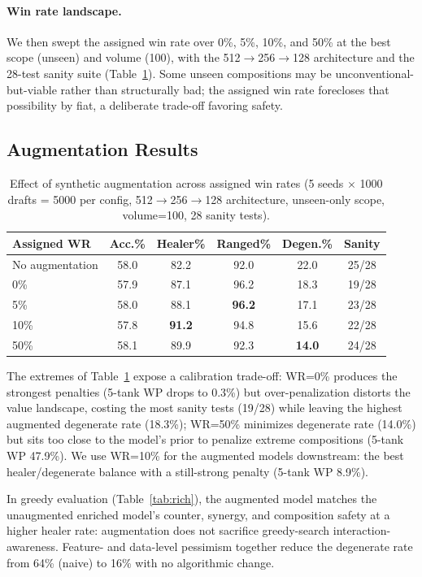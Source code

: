 \documentclass[journal]{IEEEtran}
\begin{document}
\paragraph{Win rate landscape.} We then swept the assigned win rate over 0\%, 5\%, 10\%, and 50\% at the best scope (unseen) and volume (100), with the 512$\to$256$\to$128 architecture and the 28-test sanity suite (Table~\ref{tab:synth}). Some unseen compositions may be unconventional-but-viable rather than structurally bad; the assigned win rate forecloses that possibility by fiat, a deliberate trade-off favoring safety.

\subsection{Augmentation Results}

\begin{table}[t]
\centering
\caption{Effect of synthetic augmentation across assigned win rates (5 seeds $\times$ 1000 drafts = 5000 per config, 512$\to$256$\to$128 architecture, unseen-only scope, volume=100, 28 sanity tests).}
\label{tab:synth}
\setlength{\tabcolsep}{4.5pt}
\begin{tabular}{lccccc}
\toprule
Assigned WR & Acc.\% & Healer\% & Ranged\% & Degen.\% & Sanity \\
\midrule
No augmentation & 58.0 & 82.2 & 92.0 & 22.0 & 25/28 \\
\midrule
0\% & 57.9 & 87.1 & 96.2 & 18.3 & 19/28 \\
5\% & 58.0 & 88.1 & \textbf{96.2} & 17.1 & 23/28 \\
10\% & 57.8 & \textbf{91.2} & 94.8 & 15.6 & 22/28 \\
50\% & 58.1 & 89.9 & 92.3 & \textbf{14.0} & 24/28 \\
\bottomrule
\end{tabular}
\end{table}

The extremes of Table~\ref{tab:synth} expose a calibration trade-off: WR=0\% produces the strongest penalties (5-tank WP drops to 0.3\%) but over-penalization distorts the value landscape, costing the most sanity tests (19/28) while leaving the highest augmented degenerate rate (18.3\%); WR=50\% minimizes degenerate rate (14.0\%) but sits too close to the model's prior to penalize extreme compositions (5-tank WP 47.9\%). We use WR=10\% for the augmented models downstream: the best healer/degenerate balance with a still-strong penalty (5-tank WP 8.9\%).

In greedy evaluation (Table~\ref{tab:rich}), the augmented model matches the unaugmented enriched model's counter, synergy, and composition safety at a higher healer rate: augmentation does not sacrifice greedy-search interaction-awareness. Feature- and data-level pessimism together reduce the degenerate rate from 64\% (naive) to 16\% with no algorithmic change.
\end{document}
